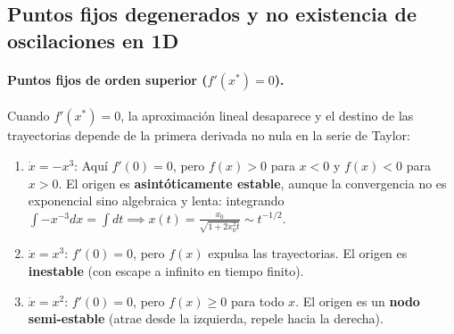 \subsection{Puntos fijos degenerados y no existencia de oscilaciones en 1D}

\paragraph{Puntos fijos de orden superior ($f'(x^*) = 0$).}
Cuando $f'(x^*) = 0$, la aproximación lineal desaparece y el destino de las trayectorias depende de la primera derivada no nula en la serie de Taylor:
\begin{enumerate}
    \item $\dot{x} = -x^3$: Aquí $f'(0) = 0$, pero $f(x) > 0$ para $x < 0$ y $f(x) < 0$ para $x > 0$. El origen es \textbf{asintóticamente estable}, aunque la convergencia no es exponencial sino algebraica y lenta: integrando $\int -x^{-3}dx = \int dt \implies x(t) = \frac{x_0}{\sqrt{1 + 2x_0^2 t}} \sim t^{-1/2}$.
    \item $\dot{x} = x^3$: $f'(0) = 0$, pero $f(x)$ expulsa las trayectorias. El origen es \textbf{inestable} (con escape a infinito en tiempo finito).
    \item $\dot{x} = x^2$: $f'(0) = 0$, pero $f(x) \ge 0$ para todo $x$. El origen es un \textbf{nodo semi-estable} (atrae desde la izquierda, repele hacia la derecha).
\end{enumerate}

